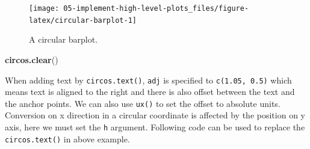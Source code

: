\documentclass[]{book}
\newenvironment{Shaded}{\begin{snugshade}}{\end{snugshade}}
\newcommand{\KeywordTok}[1]{\textcolor[rgb]{0.13,0.29,0.53}{\textbf{#1}}}
\newcommand{\DataTypeTok}[1]{\textcolor[rgb]{0.13,0.29,0.53}{#1}}
\newcommand{\DecValTok}[1]{\textcolor[rgb]{0.00,0.00,0.81}{#1}}
\newcommand{\FloatTok}[1]{\textcolor[rgb]{0.00,0.00,0.81}{#1}}
\newcommand{\StringTok}[1]{\textcolor[rgb]{0.31,0.60,0.02}{#1}}
\newcommand{\OperatorTok}[1]{\textcolor[rgb]{0.81,0.36,0.00}{\textbf{#1}}}
\newcommand{\NormalTok}[1]{#1}
\theoremstyle{definition}
\theoremstyle{definition}
\theoremstyle{remark}
\begin{document}
\begin{Shaded}
\end{Shaded}

\begin{figure}

{\centering \texttt{[image: 05-implement-high-level-plots\_files/figure-latex/circular-barplot-1]} 

}

\caption{A circular barplot.}\label{fig:circular-barplot}
\end{figure}

\begin{Shaded}
\begin{Highlighting}[]
\KeywordTok{circos.clear}\NormalTok{()}
\end{Highlighting}
\end{Shaded}

When adding text by \texttt{circos.text()}, \texttt{adj} is specified to
\texttt{c(1.05,\ 0.5)} which means text is aligned to the right and
there is also offset between the text and the anchor points. We can also
use \texttt{ux()} to set the offset to absolute units. Conversion on x
direction in a circular coordinate is affected by the position on y
axis, here we must set the \texttt{h} argument. Following code can be
used to replace the \texttt{circos.text()} in above example.

\begin{Shaded}
\end{Shaded}
\end{document}
